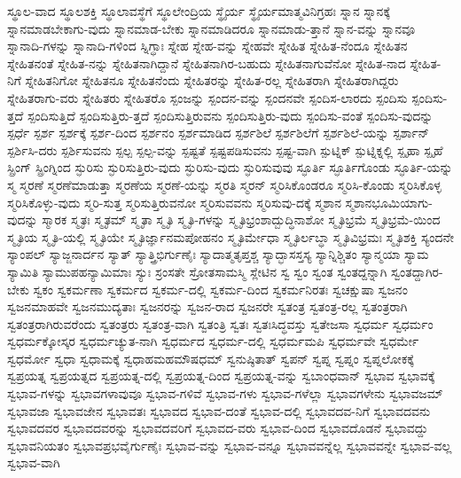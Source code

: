 {ಸ್ಥೂಲ-ವಾದ
ಸ್ಥೂಲಶಕ್ತಿ
ಸ್ಥೂಲಾವಸ್ಥೆಗೆ
ಸ್ಥೂಲೇಂದ್ರಿಯ
ಸ್ಥೈರ್ಯ
ಸ್ಥೈರ್ಯಮಾತ್ಮವಿನಿಗ್ರಹಃ
ಸ್ನಾನ
ಸ್ನಾನಕ್ಕೆ
ಸ್ನಾನಮಾಡಬೇಕಾಗು-ವುದು
ಸ್ನಾನಮಾಡ-ಬೇಕು
ಸ್ನಾನಮಾಡಿದರೂ
ಸ್ನಾನಮಾಡು-ತ್ತಾನೆ
ಸ್ನಾನ-ವನ್ನು
ಸ್ನಾನವೂ
ಸ್ನಾನಾದಿ-ಗಳನ್ನು
ಸ್ನಾನಾದಿ-ಗಳಿಂದ
ಸ್ನಿಗ್ಧಾಃ
ಸ್ನೇಹ
ಸ್ನೇಹ-ವನ್ನು
ಸ್ನೇಹವೇ
ಸ್ನೇಹಿತ
ಸ್ನೇಹಿತ-ನೆಂದೂ
ಸ್ನೇಹಿತನ
ಸ್ನೇಹಿತನಂತೆ
ಸ್ನೇಹಿತ-ನನ್ನು
ಸ್ನೇಹಿತನಾಗಿದ್ದಾನೆ
ಸ್ನೇಹಿತನಾಗಿರ-ಬಹುದು
ಸ್ನೇಹಿತನಾಗುವೆನೋ
ಸ್ನೇಹಿತ-ನಾದ
ಸ್ನೇಹಿತ-ನಿಗೆ
ಸ್ನೇಹಿತನಿಗೋ
ಸ್ನೇಹಿತನೂ
ಸ್ನೇಹಿತನೆಂದು
ಸ್ನೇಹಿತರನ್ನು
ಸ್ನೇಹಿತ-ರಲ್ಲ
ಸ್ನೇಹಿತರಾಗಿ
ಸ್ನೇಹಿತರಾಗಿದ್ದರು
ಸ್ನೇಹಿತರಾಗು-ವರು
ಸ್ನೇಹಿತರು
ಸ್ನೇಹಿತರೊ
ಸ್ಪಂಜನ್ನು
ಸ್ಪಂದನ-ವನ್ನು
ಸ್ಪಂದನವೇ
ಸ್ಪಂದಿಸ-ಲಾರದು
ಸ್ಪಂದಿಸು
ಸ್ಪಂದಿಸು-ತ್ತದೆ
ಸ್ಪಂದಿಸುತ್ತಿದೆ
ಸ್ಪಂದಿಸುತ್ತಿರು-ತ್ತದೆ
ಸ್ಪಂದಿಸುತ್ತಿರುವನು
ಸ್ಪಂದಿಸುತ್ತಿರು-ವುದು
ಸ್ಪಂದಿಸು-ವಂತೆ
ಸ್ಪಂದಿಸು-ವುದನ್ನು
ಸ್ಪರ್ಧೆ
ಸ್ಪರ್ಶ
ಸ್ಪರ್ಶಕ್ಕೆ
ಸ್ಪರ್ಶ-ದಿಂದ
ಸ್ಪರ್ಶನಂ
ಸ್ಪರ್ಶಮಾಡಿದ
ಸ್ಪರ್ಶಶಿಲೆ
ಸ್ಪರ್ಶಶಿಲೆಗೆ
ಸ್ಪರ್ಶಶಿಲೆ-ಯನ್ನು
ಸ್ಪರ್ಶಾನ್
ಸ್ಪರ್ಶಿಸಿ-ದರು
ಸ್ಪರ್ಶಿಸುವನು
ಸ್ಪಲ್ಪ
ಸ್ಪಲ್ಪ-ವನ್ನು
ಸ್ಪಷ್ಟತೆ
ಸ್ಪಷ್ಟಪಡಿಸುವನು
ಸ್ಪಷ್ಟ-ವಾಗಿ
ಸ್ಪುಟ್ನಿಕ್
ಸ್ಪುಟ್ನಿಕ್ನಲ್ಲಿ
ಸ್ಪೃಹಾ
ಸ್ಪೃಹೆ
ಸ್ಪ್ರಿಂಗ್
ಸ್ಪ್ರಿಂಗ್ನಿಂದ
ಸ್ಫುರಿಸು
ಸ್ಫುರಿಸುತ್ತಿರು-ವುದು
ಸ್ಫುರಿಸು-ವುದು
ಸ್ಫುರಿಸುವುವು
ಸ್ಫೂರ್ತಿ
ಸ್ಫೂರ್ತಿಗೊಂಡು
ಸ್ಫೂರ್ತಿ-ಯನ್ನು
ಸ್ಮ
ಸ್ಮರಣೆ
ಸ್ಮರಣೆಮಾಡುತ್ತಾ
ಸ್ಮರಣೆಯ
ಸ್ಮರಣೆ-ಯನ್ನು
ಸ್ಮರತಿ
ಸ್ಮರನ್
ಸ್ಮರಿಸಿಕೊಂಡರೂ
ಸ್ಮರಿಸಿ-ಕೊಂಡು
ಸ್ಮರಿಸಿಕೊಳ್ಳ
ಸ್ಮರಿಸಿಕೊಳ್ಳು-ವುದು
ಸ್ಮರಿ-ಸುತ್ತ
ಸ್ಮರಿಸುತ್ತಿರುವನೋ
ಸ್ಮರಿಸುವವನು
ಸ್ಮರಿಸುವು-ದಕ್ಕೆ
ಸ್ಮಶಾನ
ಸ್ಮಶಾನಭೂಮಿಯಾಗು-ವುದನ್ನು
ಸ್ಮಾರಕ
ಸ್ಮೃತಃ
ಸ್ಮೃತಮ್
ಸ್ಮೃತಾ
ಸ್ಮೃತಿ
ಸ್ಮೃತಿ-ಗಳನ್ನು
ಸ್ಮೃತಿಭ್ರಂಶಾದ್ಬುದ್ಧಿನಾಶೋ
ಸ್ಮೃತಿಭ್ರಮೆ
ಸ್ಮೃತಿಭ್ರಮೆ-ಯಿಂದ
ಸ್ಮೃತಿಯ
ಸ್ಮೃತಿ-ಯಲ್ಲಿ
ಸ್ಮೃತಿಯೇ
ಸ್ಮೃತಿರ್ಜ್ಞಾನಮಪೋಹನಂ
ಸ್ಮೃತಿರ್ಮೇಧಾ
ಸ್ಮೃತಿರ್ಲಬ್ಧಾ
ಸ್ಮೃತಿವಿಭ್ರಮಃ
ಸ್ಮೃತಿಶಕ್ತಿ
ಸ್ಯಂದನೇ
ಸ್ಯಾಂಪಲ್
ಸ್ಯಾಜ್ಜನಾರ್ದನ
ಸ್ಯಾತ್
ಸ್ಯಾತ್ತ್ರಿಭಿರ್ಗುಣೈಃ
ಸ್ಯಾದಾತ್ಮತೃಪ್ತಶ್ಚ
ಸ್ಯಾದ್ಭಾಸಸ್ತಸ್ಯ
ಸ್ಯಾನ್ನಿಶ್ಚಿತಂ
ಸ್ಯಾನ್ಮಯಾ
ಸ್ಯಾಮ
ಸ್ಯಾಮಿತಿ
ಸ್ಯಾಮುಪಹನ್ಯಾಮಿಮಾಃ
ಸ್ಯುಃ
ಸ್ರಂಸತೇ
ಸ್ರೋತಸಾಮಸ್ಮಿ
ಸ್ಲೇಟಿನ
ಸ್ವ
ಸ್ವಂ
ಸ್ವಂತ
ಸ್ವಂತದ್ದನ್ನಾಗಿ
ಸ್ವಂತದ್ದಾಗಿರ-ಬೇಕು
ಸ್ವಕಂ
ಸ್ವಕರ್ಮಣಾ
ಸ್ವಕರ್ಮದ
ಸ್ವಕರ್ಮ-ದಲ್ಲಿ
ಸ್ವಕರ್ಮ-ದಿಂದ
ಸ್ವಕರ್ಮನಿರತಃ
ಸ್ವಚಕ್ಷುಷಾ
ಸ್ವಜನಂ
ಸ್ವಜನಮಾಹವೇ
ಸ್ವಜನಮುದ್ಯತಾಃ
ಸ್ವಜನರನ್ನು
ಸ್ವಜನ-ರಾದ
ಸ್ವಜನರೇ
ಸ್ವತಂತ್ರ
ಸ್ವತಂತ್ರ-ರಲ್ಲ
ಸ್ವತಂತ್ರರಾಗಿ
ಸ್ವತಂತ್ರರಾಗಿರುವರೆಂದು
ಸ್ವತಂತ್ರರು
ಸ್ವತಂತ್ರ-ವಾಗಿ
ಸ್ವತಂತ್ರಿ
ಸ್ವತಃ
ಸ್ವತಃಸಿದ್ಧವಸ್ತು
ಸ್ವತೇಜಸಾ
ಸ್ವಧರ್ಮ
ಸ್ವಧರ್ಮಂ
ಸ್ವಧರ್ಮಕ್ಕೋಸ್ಕರ
ಸ್ವಧರ್ಮಚ್ಯುತ-ನಾಗಿ
ಸ್ವಧರ್ಮದ
ಸ್ವಧರ್ಮ-ದಲ್ಲಿ
ಸ್ವಧರ್ಮಮಪಿ
ಸ್ವಧರ್ಮವೇ
ಸ್ವಧರ್ಮೇ
ಸ್ವಧರ್ಮೋ
ಸ್ವಧಾ
ಸ್ವಧಾಮಕ್ಕೆ
ಸ್ವಧಾಹಮಹಮೌಷಧಮ್
ಸ್ವನುಷ್ಠಿತಾತ್
ಸ್ವಪನ್
ಸ್ವಪ್ನ
ಸ್ವಪ್ನಂ
ಸ್ವಪ್ನಲೋಕಕ್ಕೆ
ಸ್ವಪ್ರಯತ್ನ
ಸ್ವಪ್ರಯತ್ನದ
ಸ್ವಪ್ರಯತ್ನ-ದಲ್ಲಿ
ಸ್ವಪ್ರಯತ್ನ-ದಿಂದ
ಸ್ವಪ್ರಯತ್ನ-ವನ್ನು
ಸ್ವಬಾಂಧವಾನ್
ಸ್ವಭಾವ
ಸ್ವಭಾವಕ್ಕೆ
ಸ್ವಭಾವ-ಗಳನ್ನು
ಸ್ವಭಾವಗಳಾವುವೂ
ಸ್ವಭಾವ-ಗಳಿವೆ
ಸ್ವಭಾವ-ಗಳು
ಸ್ವಭಾವ-ಗಳೆಲ್ಲಾ
ಸ್ವಭಾವಗಳೇನು
ಸ್ವಭಾವಜಮ್
ಸ್ವಭಾವಜಾ
ಸ್ವಭಾವಜೇನ
ಸ್ವಭಾವತಃ
ಸ್ವಭಾವದ
ಸ್ವಭಾವ-ದಂತೆ
ಸ್ವಭಾವ-ದಲ್ಲಿ
ಸ್ವಭಾವದವ-ನಿಗೆ
ಸ್ವಭಾವದವನು
ಸ್ವಭಾವದವರ
ಸ್ವಭಾವದವರನ್ನು
ಸ್ವಭಾವದವರಿಗೆ
ಸ್ವಭಾವದ-ವರು
ಸ್ವಭಾವ-ದಿಂದ
ಸ್ವಭಾವದೊಡನೆ
ಸ್ವಭಾವದ್ದು
ಸ್ವಭಾವನಿಯತಂ
ಸ್ವಭಾವಪ್ರಭವೈರ್ಗುಣೈಃ
ಸ್ವಭಾವ-ವನ್ನು
ಸ್ವಭಾವ-ವನ್ನೂ
ಸ್ವಭಾವವನ್ನೆಲ್ಲ
ಸ್ವಭಾವವನ್ನೇ
ಸ್ವಭಾವ-ವಲ್ಲ
ಸ್ವಭಾವ-ವಾಗಿ
}
